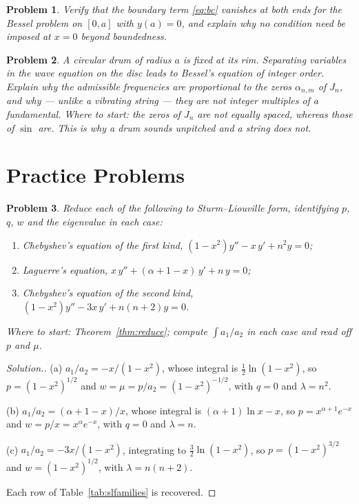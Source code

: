 \documentclass[12pt,a4paper]{report}
\theoremstyle{definition}
\theoremstyle{plain}
\newtheorem{problemx}{Problem}[section]
\newenvironment{problem}{\begin{problemx}}{\end{problemx}}
\newenvironment{solution}
  {\renewcommand{\qedsymbol}{}\begin{proof}[\textit{Solution}.]}
  {\end{proof}}
\begin{document}
\begin{problem}
Verify that the boundary term \eqref{eq:bc} vanishes at both ends for the
Bessel problem on $[0,a]$ with $y(a)=0$, and explain why no condition need be
imposed at $x=0$ beyond boundedness.
\end{problem}

\begin{problem}
A circular drum of radius $a$ is fixed at its rim. Separating variables in the
wave equation on the disc leads to Bessel's equation of integer order. Explain
why the admissible frequencies are proportional to the zeros $\alpha_{n,m}$ of
$J_n$, and why --- unlike a vibrating string --- they are not integer multiples
of a fundamental.
\emph{Where to start: the zeros of $J_n$ are not equally spaced, whereas those
of $\sin$ are. This is why a drum sounds unpitched and a string does not.}
\end{problem}


\section{Practice Problems}

\begin{problem}
Reduce each of the following to Sturm--Liouville form, identifying $p$, $q$, $w$
and the eigenvalue in each case:
\begin{enumerate}
\item[(a)] Chebyshev's equation of the first kind,
$\left(1-x^{2}\right)y''-x\,y'+n^{2}y=0$;
\item[(b)] Laguerre's equation, $x\,y''+(\alpha+1-x)\,y'+n\,y=0$;
\item[(c)] Chebyshev's equation of the second kind,
$\left(1-x^{2}\right)y''-3x\,y'+n(n+2)y=0$.
\end{enumerate}
\emph{Where to start: Theorem~\ref{thm:reduce}; compute
$\int a_1/a_2$ in each case and read off $p$ and $\mu$.}
\end{problem}

\begin{solution}
(a) $a_1/a_2 = -x/(1-x^{2})$, whose integral is
$\tfrac12\ln\left(1-x^{2}\right)$, so
$p=\left(1-x^{2}\right)^{1/2}$ and
$w=\mu=p/a_2=\left(1-x^{2}\right)^{-1/2}$, with $q=0$ and $\lambda=n^{2}$.

(b) $a_1/a_2 = (\alpha+1-x)/x$, whose integral is
$(\alpha+1)\ln x - x$, so $p = x^{\alpha+1}e^{-x}$ and
$w = p/x = x^{\alpha}e^{-x}$, with $q=0$ and $\lambda=n$.

(c) $a_1/a_2 = -3x/(1-x^{2})$, integrating to
$\tfrac32\ln\left(1-x^{2}\right)$, so $p=\left(1-x^{2}\right)^{3/2}$ and
$w=\left(1-x^{2}\right)^{1/2}$, with $\lambda=n(n+2)$.

Each row of Table~\ref{tab:slfamilies} is recovered.
\end{solution}
\end{document}
